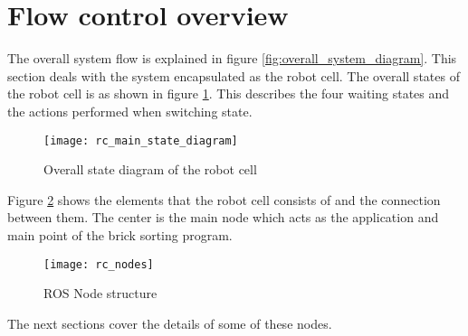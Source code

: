 \section{Flow control overview}
\label{sec:rc_flow_control}
The overall system flow is explained in figure \ref{fig:overall_system_diagram}. This section deals with the system encapsulated as the robot cell. The overall states of the  robot cell is as shown in figure \ref{fig:rc_main_state}. This describes the four waiting states and the actions performed when switching state.
	
	\begin{figure}[H]
		\centering
	    \texttt{[image: rc\_main\_state\_diagram]}
	    \caption{Overall state diagram of the robot cell}
		\label{fig:rc_main_state}
	\end{figure}
	
Figure \ref{fig:rc_nodes} shows the elements that the robot cell consists of and the connection between them. The center is the main node which acts as the application and main point of the brick sorting program. 

	\begin{figure}[H]
		\centering
	    \texttt{[image: rc\_nodes]}
	    \caption{ROS Node structure}
		\label{fig:rc_nodes}
	\end{figure}
	
The next sections cover the details of some of these nodes.
	